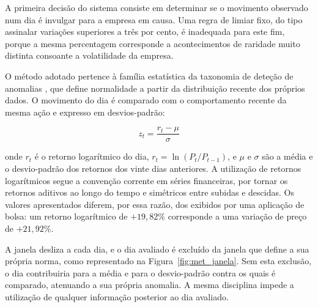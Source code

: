 A primeira decisão do sistema consiste em determinar se o movimento observado num dia é invulgar
para a empresa em causa. Uma regra de limiar fixo, do tipo assinalar variações superiores a três
por cento, é inadequada para este fim, porque a mesma percentagem corresponde a acontecimentos de
raridade muito distinta consoante a volatilidade da empresa.

O método adotado pertence à família estatística da taxonomia de deteção de anomalias
\autocite{chandola2009anomaly}, que define normalidade a partir da distribuição recente dos
próprios dados. O movimento do dia é comparado com o comportamento recente da mesma ação e
expresso em desvios-padrão:

\begin{equation}
z_t = \frac{r_t - \mu}{\sigma}
\label{eq:zscore}
\end{equation}

onde $r_t$ é o retorno logarítmico do dia, $r_t = \ln(P_t / P_{t-1})$, e $\mu$ e $\sigma$ são a
média e o desvio-padrão dos retornos dos vinte dias anteriores. A utilização de retornos
logarítmicos segue a convenção corrente em séries financeiras, por tornar os retornos aditivos ao
longo do tempo e simétricos entre subidas e descidas. Os valores apresentados diferem, por essa
razão, dos exibidos por uma aplicação de bolsa: um retorno logarítmico de $+19{,}82\%$ corresponde
a uma variação de preço de $+21{,}92\%$.

A janela desliza a cada dia, e o dia avaliado é excluído da janela que define a sua própria norma,
como representado na Figura~\ref{fig:met_janela}. Sem esta exclusão, o dia contribuiria para a
média e para o desvio-padrão contra os quais é comparado, atenuando a sua própria anomalia. A
mesma disciplina impede a utilização de qualquer informação posterior ao dia avaliado.

